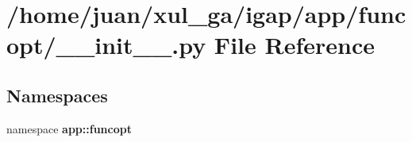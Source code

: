\section{/home/juan/xul\_\-ga/igap/app/funcopt/\_\-\_\-init\_\-\_\-.py File Reference}
\label{app_2funcopt_2____init_____8py}
\subsection*{Namespaces}
\begin{CompactItemize}
\item 
namespace {\bf app::funcopt}
\end{CompactItemize}
